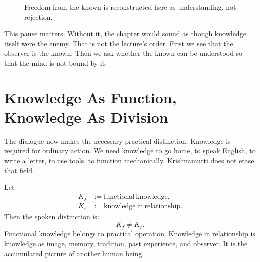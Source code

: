 \begin{figure}
\centering
{}
\caption{Freedom from the known is reconstructed here as understanding, not rejection.}
\end{figure}

This pause matters. Without it, the chapter would sound as though knowledge itself were the enemy. That is not the lecture's order. First we see that the observer is the known. Then we ask whether the known can be understood so that the mind is not bound by it.

\section{Knowledge As Function, Knowledge As Division}

The dialogue now makes the necessary practical distinction. Knowledge is required for ordinary action. We need knowledge to go home, to speak English, to write a letter, to use tools, to function mechanically. Krishnamurti does not erase that field.

Let
\begin{align}
K_f &:= \mathrm{functional\ knowledge},\\
K_r &:= \mathrm{knowledge\ in\ relationship}.
\end{align}
Then the spoken distinction is:
\begin{equation}
K_f \neq K_r.
\end{equation}
Functional knowledge belongs to practical operation. Knowledge in relationship is knowledge as image, memory, tradition, past experience, and observer. It is the accumulated picture of another human being.

